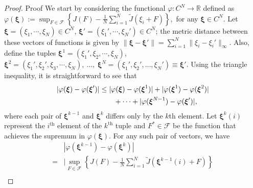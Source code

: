 \documentclass[11pt,leqno]{amsart}
\begin{document}
\sloppy
\begin{proof}{Proof}
We start by considering the functional $ \varphi : C^N \to \mathbb R$ defined as 
\(
 \varphi( \boldsymbol\xi ) := \sup_{F \in \mathcal{F}} \left \{J(F) - \frac{1}{N} \sum_{i=1}^N \tilde J(\xi_i+F) \right\},   
\)
for any $ \boldsymbol\xi  \in C^N$. Let $ \boldsymbol\xi =(\xi_1,\cdots, \xi_N) \in C^N$, $ \boldsymbol\xi '=(\xi_1',\cdots, \xi_N') \in C^N$; the metric distance between these vectors of functions is given by $ \| \boldsymbol\xi - \boldsymbol\xi '\|=\sum_{i=1}^N \|\xi_i-\xi_i'\|_{\infty}$. Also, define the tuples $ \boldsymbol\xi ^1 = (\xi_1',\xi_2,\cdots,\xi_N)$, $ \boldsymbol\xi ^2 = (\xi_1',\xi_2', \xi_3,\cdots,\xi_N),~\ldots,~  \boldsymbol\xi ^N = (\xi_1',\xi_2',\ldots,\xi_N') \equiv  \boldsymbol\xi '$. Using the triangle inequality, it is straightforward to see that
\begin{align}
    |\varphi( \boldsymbol\xi )-\varphi( \boldsymbol\xi ')|
    \label{eq:varphi-metric}
    &\leq |\varphi( \boldsymbol\xi )-\varphi( \boldsymbol\xi ^1)|+|\varphi( \boldsymbol\xi ^1)-\varphi( \boldsymbol\xi ^2)|\notag\\
    &\qquad+\cdots+|\varphi( \boldsymbol\xi ^{N-1})-\varphi( \boldsymbol\xi ')|,
\end{align}
where each pair of $ \boldsymbol\xi ^{k-1}$ and $ \boldsymbol\xi ^k$ differs only by the $k$th element. Let $ \boldsymbol\xi ^k(i)$ represent the $i^{\text{th}}$ element of the $k^{\text{th}}$ tuple and $F^* \in \mathcal{F}$ be the function that achieves the supremum in $\varphi( \boldsymbol\xi )$. For any such pair of vectors, we have 
\begin{align*}
&\left|\varphi( \boldsymbol\xi ^{k-1})-\varphi( \boldsymbol\xi ^{k})\right|\\
    =&\bigg| \sup_{F \in \mathcal{F}} \left \{J(F) - \frac{1}{N} \sum_{i=1}^N \tilde J( \boldsymbol\xi ^{k-1}(i) +F) \right\}\\ 

\end{align*}
\end{proof}
\end{document}
